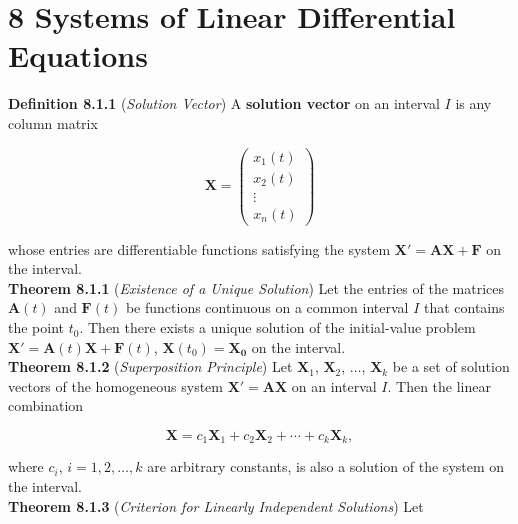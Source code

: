 \documentclass[12pt]{article}
\begin{document}
\newpage

\section*{8 Systems of Linear Differential Equations}

\noindent\textbf{Definition 8.1.1} (\emph{Solution Vector}) A \textbf{solution vector} on an interval \(I\) is any column matrix

\begin{equation}
    \mathbf{X} = \begin{pmatrix}
        x_1(t) \\
        x_2(t) \\
        \vdots \\
        x_n(t)
    \end{pmatrix}
\end{equation}

\noindent whose entries are differentiable functions satisfying the system \(\mathbf{X'} = \mathbf{AX} + \mathbf{F}\) on the interval.\\

\noindent\textbf{Theorem 8.1.1} (\emph{Existence of a Unique Solution}) Let the entries of the matrices \(\mathbf{A}(t)\) and \(\mathbf{F}(t)\) be functions continuous on a common interval \(I\) that contains the point \(t_0\). Then there exists a unique solution of the initial-value problem \(\mathbf{X'} = \mathbf{A}(t)\mathbf{X} + \mathbf{F}(t)\), \(\mathbf{X}(t_0) = \mathbf{X_0}\) on the interval.\\

\noindent\textbf{Theorem 8.1.2} (\emph{Superposition Principle}) Let \(\mathbf{X}_1\), \(\mathbf{X}_2\), \(\ldots\), \(\mathbf{X}_k\) be a set of solution vectors of the homogeneous system \(\mathbf{X'} = \mathbf{A}\mathbf{X}\) on an interval \(I\). Then the linear combination

\begin{equation}
    \mathbf{X} = c_1\mathbf{X}_1 + c_2\mathbf{X}_2 + \cdots + c_k\mathbf{X}_k,
\end{equation}

\noindent where \(c_i\), \(i = 1, 2, \ldots, k\) are arbitrary constants, is also a solution of the system on the interval.\\

\noindent\textbf{Theorem 8.1.3} (\emph{Criterion for Linearly Independent Solutions}) Let
\end{document}
